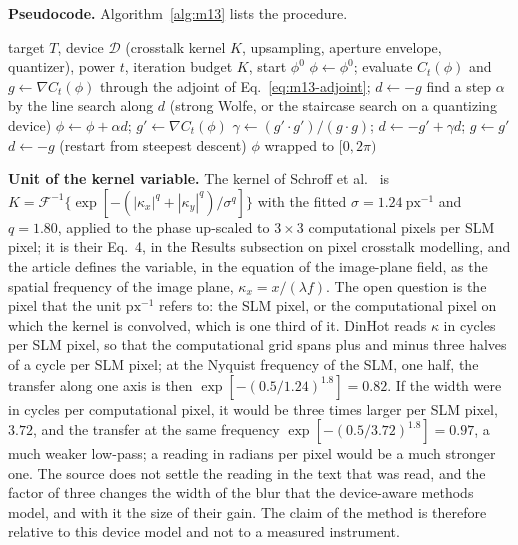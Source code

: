 \textbf{Pseudocode.} Algorithm~\ref{alg:m13} lists the procedure.

\begin{algorithm}[t]
\caption{Conjugate gradient through the device model. The gradient is the adjoint of the crosstalk operator; a staircase line search replaces the strong-Wolfe search where the quantizer makes the cost a staircase.}
\label{alg:m13}
\begin{algorithmic}[1]
\Require target $T$, device $\mathcal D$ (crosstalk kernel $K$, upsampling, aperture envelope, quantizer), power $t$, iteration budget $K$, start $\phi^0$
\State $\phi\gets\phi^0$; evaluate $C_t(\phi)$ and $g\gets\nabla C_t(\phi)$ through the adjoint of Eq.~\eqref{eq:m13-adjoint}; $d\gets-g$
  \State find a step $\alpha$ by the line search along $d$ (strong Wolfe, or the staircase search on a quantizing device)
  \State $\phi\gets\phi+\alpha d$; $g'\gets\nabla C_t(\phi)$
  \State $\gamma\gets (g'\cdot g')/(g\cdot g)$; $d\gets -g'+\gamma d$; $g\gets g'$
   \State $d\gets -g$ (restart from steepest descent) \EndIf
\EndFor
\State \Return $\phi$ wrapped to $[0,2\pi)$
\end{algorithmic}
\end{algorithm}

\textbf{Unit of the kernel variable.} The kernel of Schroff et al.~\cite{schroff} is $K=\mathcal F^{-1}\{\exp[-(|\kappa_x|^q+|\kappa_y|^q)/\sigma^q]\}$ with the fitted $\sigma=1.24\ \mathrm{px}^{-1}$ and $q=1.80$, applied to the phase up-scaled to $3\times3$ computational pixels per SLM pixel; it is their Eq.~4, in the Results subsection on pixel crosstalk modelling, and the article defines the variable, in the equation of the image-plane field, as the spatial frequency of the image plane, $\kappa_x=x/(\lambda f)$. The open question is the pixel that the unit $\mathrm{px}^{-1}$ refers to: the SLM pixel, or the computational pixel on which the kernel is convolved, which is one third of it. DinHot reads $\kappa$ in cycles per SLM pixel, so that the computational grid spans plus and minus three halves of a cycle per SLM pixel; at the Nyquist frequency of the SLM, one half, the transfer along one axis is then $\exp[-(0.5/1.24)^{1.8}]=0.82$. If the width were in cycles per computational pixel, it would be three times larger per SLM pixel, $3.72$, and the transfer at the same frequency $\exp[-(0.5/3.72)^{1.8}]=0.97$, a much weaker low-pass; a reading in radians per pixel would be a much stronger one. The source does not settle the reading in the text that was read, and the factor of three changes the width of the blur that the device-aware methods model, and with it the size of their gain. The claim of the method is therefore relative to this device model and not to a measured instrument.

